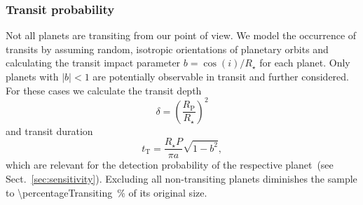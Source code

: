 \documentclass[modern]{aastex631}
\begin{document}
\subsubsection{Transit probability}
\begin{note}
    Not all planets are transiting from our point of view.
    We model the occurrence of transits by assuming random, isotropic orientations of planetary orbits and calculating the transit impact parameter $b = \cos(i)/R_\star$ for each planet.
    Only planets with $|b| < 1$ are potentially observable in transit and further considered.
    For these cases we calculate the transit depth
    \begin{equation}\label{eq:transitdepth}
        \delta = \left( \frac{R_\mathrm{P}}{R_\star} \right)^2
    \end{equation}
    and transit duration
    \begin{equation}\label{eq:transitduration}
        t_{\mathrm{T}} = \frac{R_\star P}{\pi a} \sqrt{1 - b^2},
    \end{equation}
    which are relevant for the detection probability of the respective planet~(see Sect.~\ref{sec:sensitivity}).
    Excluding all non-transiting planets diminishes the sample to \SI{\percentageTransiting}{\percent} of its original size.
\end{note}
\end{document}
